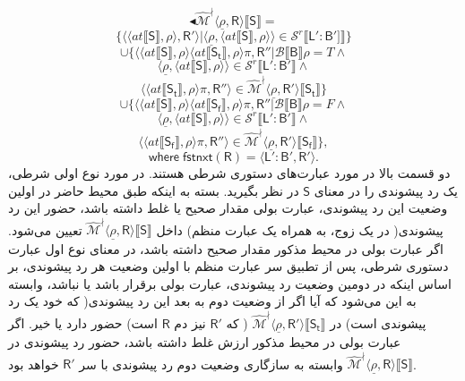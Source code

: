 $$\blacktriangleleft\mathcal{\hat{M}^\nmid} \langle \underline{\rho},\mathsf{R} \rangle \llbracket \mathsf{S} \rrbracket=$$
$$\{\langle \langle at \llbracket \mathsf{S} \rrbracket , \rho \rangle , \mathsf{R'} \rangle | \langle \underline{\rho} , \langle at \llbracket \mathsf{S} \rrbracket , \rho \rangle \rangle \in \mathcal{S}^r \llbracket \mathsf{L':B'} ]\rrbracket \}$$
$$\cup \{\langle \langle at \llbracket \mathsf{S} \rrbracket , \rho \rangle \langle at \llbracket \mathsf{S_t} \rrbracket, \rho \rangle \pi, \mathsf{R''} | \mathcal{B}\llbracket\mathsf{B} \rrbracket \rho = \mathit{T} \land$$
$$\langle \underline{\rho},\langle at \llbracket \mathsf{S} \rrbracket , \rho \rangle \rangle \in \mathcal{S}^r \llbracket \mathsf{L':B'} \rrbracket \land$$
$$\langle \langle at \llbracket \mathsf{S_t} \rrbracket , \rho \rangle \pi,\mathsf{R''} \rangle \in \mathcal{\hat{M}^\nmid} \langle \underline{\rho}, \mathsf{R'} \rangle  \llbracket \mathsf{S_t} \rrbracket \}$$
$$\cup \{\langle \langle at \llbracket \mathsf{S} \rrbracket , \rho \rangle \langle at \llbracket \mathsf{S_f} \rrbracket, \rho \rangle \pi, \mathsf{R''} | \mathcal{B}\llbracket\mathsf{B} \rrbracket \rho = \mathit{F} \land$$
$$\langle \underline{\rho},\langle at \llbracket \mathsf{S} \rrbracket , \rho \rangle \rangle \in \mathcal{S}^r \llbracket \mathsf{L':B'} \rrbracket \land$$
$$\langle \langle at \llbracket \mathsf{S_f} \rrbracket , \rho \rangle \pi,\mathsf{R''} \rangle \in \mathcal{\hat{M}^\nmid}  \langle \underline{\rho}, \mathsf{R'} \rangle \llbracket \mathsf{S_f} \rrbracket \},$$
$$\mathsf{where\; fstnxt(R)=\langle L':B', R' \rangle}.$$
دو قسمت بالا در مورد عبارت‌های دستوری شرطی هستند. در مورد نوع اولی شرطی، یک رد پیشوندی را در معنای $\mathsf{S}$ در نظر بگیرید. بسته به اینکه طبق محیط حاضر در اولین وضعیت این رد پیشوندی، عبارت بولی مقدار صحیح یا غلط داشته باشد، حضور این رد پیشوندی( در یک زوج، به همراه یک عبارت منظم) داخل 
$\mathcal{\hat{M}^\nmid} \langle \underline{\rho},\mathsf{R} \rangle \llbracket \mathsf{S} \rrbracket$
تعیین می‌شود. اگر عبارت بولی در محیط مذکور مقدار صحیح داشته باشد، 
در معنای نوع اول عبارت‌ دستوری شرطی، پس از تطبیق سر عبارت منظم با اولین وضعیت هر رد پیشوندی، بر اساس اینکه در دومین وضعیت رد پیشوندی، عبارت بولی برقرار باشد یا نباشد، وابسته به این می‌شود که آیا اگر از وضعیت دوم به بعد این رد پیشوندی( که خود یک رد پیشوندی است) در 
$\mathcal{\hat{M}^\nmid} \langle \underline{\rho},\mathsf{R'} \rangle \llbracket \mathsf{S_t} \rrbracket$
( که $\mathsf{R'}$ نیز دم $\mathsf{R}$ است) حضور دارد یا خیر. اگر عبارت بولی در محیط مذکور ارزش غلط داشته باشد، حضور رد پیشوندی در
$\mathcal{\hat{M}^\nmid} \langle \underline{\rho},\mathsf{R} \rangle \llbracket \mathsf{S} \rrbracket$
وابسته به سازگاری وضعیت دوم رد پیشوندی با سر $\mathsf{R'}$ خواهد بود.

